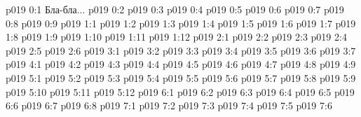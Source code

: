 \author{Божественный Советник}
\vs p019 0:1  Бла-бла...
\vs p019 0:2 
\vs p019 0:3 
\vs p019 0:4 
\vs p019 0:5 
\vs p019 0:6 
\vs p019 0:7 
\vs p019 0:8 
\vs p019 0:9 \pc 
{}
\vs p019 1:1 
\vs p019 1:2 
\vs p019 1:3 
\vs p019 1:4 
\vs p019 1:5 
\vs p019 1:6 
\vs p019 1:7 \pc 
\vs p019 1:8 
\vs p019 1:9 
\vs p019 1:10 
\vs p019 1:11 
\vs p019 1:12 \pc 
{}
\vs p019 2:1 
\vs p019 2:2 
\vs p019 2:3 \pc 
\vs p019 2:4 
\vs p019 2:5 
\vs p019 2:6 \pc 
{}
\vs p019 3:1 
\vs p019 3:2 
\vs p019 3:3 
\vs p019 3:4 \pc 
\vs p019 3:5 
\vs p019 3:6 \pc 
\vs p019 3:7 
\vs p019 4:1 
\vs p019 4:2 
\vs p019 4:3 
\vs p019 4:4 \pc 
\vs p019 4:5 \pc 
\vs p019 4:6 
\vs p019 4:7 
\vs p019 4:8 \pc 
\vs p019 4:9 
\vs p019 5:1 
\vs p019 5:2 
\vs p019 5:3 
\vs p019 5:4 
\vs p019 5:5 \pc 
\vs p019 5:6 
\vs p019 5:7 
\vs p019 5:8 \pc 
\vs p019 5:9 
\vs p019 5:10 
\vs p019 5:11 
\vs p019 5:12 
\vs p019 6:1 
\vs p019 6:2 
\vs p019 6:3 \pc 
\vs p019 6:4 \pc 
\vs p019 6:5 
\vs p019 6:6 
\vs p019 6:7 
\vs p019 6:8 
\vs p019 7:1 
\vs p019 7:2 \pc 
\vs p019 7:3 \pc 
\vs p019 7:4 
\vs p019 7:5 
\vsetoff
\vs p019 7:6 
\quizlink
